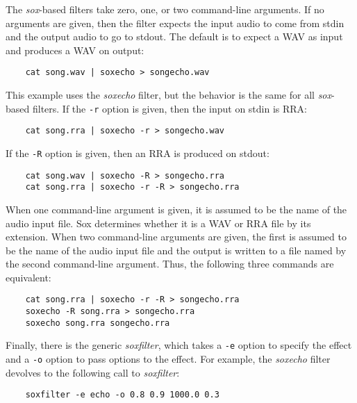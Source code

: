 \documentclass{article}
\begin{document}
The {\it sox}-based filters take zero, one, or two command-line arguments. 
If no arguments are given, then the filter expects the input audio to 
come from stdin and the output audio to go to stdout. The default is to
expect a WAV as input and produces a WAV on output:

\begin{verbatim}
    cat song.wav | soxecho > songecho.wav
\end{verbatim}

This example uses the {\it soxecho} filter, but the behavior is the same for
all {\it sox}-based filters.
If the \verb!-r! option is given, then the input on stdin is RRA:

\begin{verbatim}
    cat song.rra | soxecho -r > songecho.wav
\end{verbatim}

If the \verb!-R! option is given, then an RRA is produced on stdout:

\begin{verbatim}
    cat song.wav | soxecho -R > songecho.rra
    cat song.rra | soxecho -r -R > songecho.rra
\end{verbatim}

When one command-line argument is given, it is assumed to be the name
of the audio input file. Sox determines whether it is a WAV or RRA file
by its extension. When two command-line arguments are given, the first
is assumed to be the name of the audio input file and the output is written
to a file named by the second command-line argument. Thus, the following
three commands are equivalent:

\begin{verbatim}
    cat song.rra | soxecho -r -R > songecho.rra
    soxecho -R song.rra > songecho.rra
    soxecho song.rra songecho.rra
\end{verbatim}

Finally, there is the generic {\it soxfilter}, which takes a \verb!-e!
option to
specify the effect and a \verb!-o! option to pass options to the effect.
For example,
the {\it soxecho} filter devolves to the following call to {\it soxfilter}:

\begin{verbatim}
    soxfilter -e echo -o 0.8 0.9 1000.0 0.3
\end{verbatim}
\end{document}
